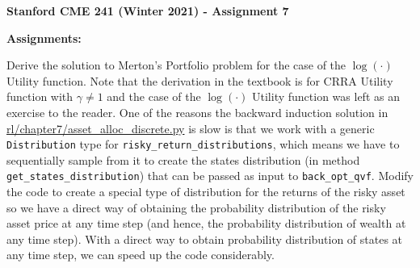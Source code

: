 \documentclass[12pt]{exam}
\begin{document}
\begin{center}
{\large {\bf Stanford CME 241 (Winter 2021) - Assignment 7}}
\end{center}
 
{\large{\bf Assignments:}}
\begin{questions}
\question Derive the solution to Merton's Portfolio problem for the case of the $\log(\cdot)$ Utility function. Note that the derivation in the textbook is for CRRA Utility function with $\gamma \neq 1$ and the case of the $\log(\cdot)$ Utility function was left as an exercise to the reader.
\question One of the reasons the backward induction solution in \href{https://github.com/TikhonJelvis/RL-book/blob/master/rl/chapter7/asset_alloc_discrete.py}{rl\//chapter7\//asset\_alloc\_discrete.py} is slow is that we work with a generic \lstinline{Distribution} type for \lstinline{risky_return_distributions}, which means we have to sequentially sample from it to create the states distribution (in method \lstinline{get_states_distribution}) that can be passed as input to \lstinline{back_opt_qvf}. Modify the code to create a special type of distribution for the returns of the risky asset so we have a direct way of obtaining the probability distribution of the risky asset price at any time step (and hence, the probability distribution of wealth at any time step). With a direct way to obtain probability distribution of states at any time step, we can speed up the code considerably. 
\end{questions}
\end{document}

